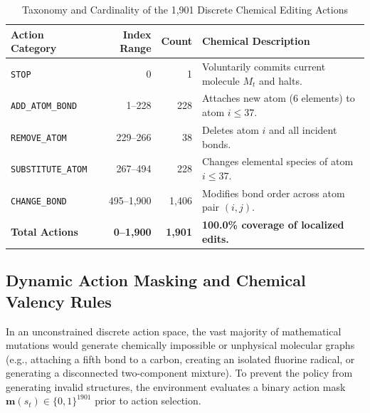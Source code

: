 \documentclass{ieeeaccess}
\begin{document}
\begin{table}[!tbp]
\caption{Taxonomy and Cardinality of the 1,901 Discrete Chemical Editing Actions}
\label{tab:action_breakdown}
\centering
\footnotesize
\begin{tabularx}{\columnwidth}{l r r X}
\toprule
\textbf{Action Category} & \textbf{Index Range} & \textbf{Count} & \textbf{Chemical Description}\\
\midrule
\texttt{STOP} & 0 & 1 & Voluntarily commits current molecule $M_t$ and halts.\\
\texttt{ADD\_ATOM\_BOND} & 1--228 & 228 & Attaches new atom (6 elements) to atom $i \le 37$.\\
\texttt{REMOVE\_ATOM} & 229--266 & 38 & Deletes atom $i$ and all incident bonds.\\
\texttt{SUBSTITUTE\_ATOM} & 267--494 & 228 & Changes elemental species of atom $i \le 37$.\\
\texttt{CHANGE\_BOND} & 495--1,900 & 1,406 & Modifies bond order across atom pair $(i, j)$.\\
\midrule
\textbf{Total Actions} & \textbf{0--1,900} & \textbf{1,901} & \textbf{100.0\% coverage of localized edits.}\\
\bottomrule
\end{tabularx}
\end{table}

\subsection{Dynamic Action Masking and Chemical Valency Rules}
In an unconstrained discrete action space, the vast majority of mathematical mutations would generate chemically impossible or unphysical molecular graphs (e.g., attaching a fifth bond to a carbon, creating an isolated fluorine radical, or generating a disconnected two-component mixture). To prevent the policy from generating invalid structures, the environment evaluates a binary action mask $\mathbf{m}(s_t) \in \{0, 1\}^{1901}$ prior to action selection.
\end{document}

